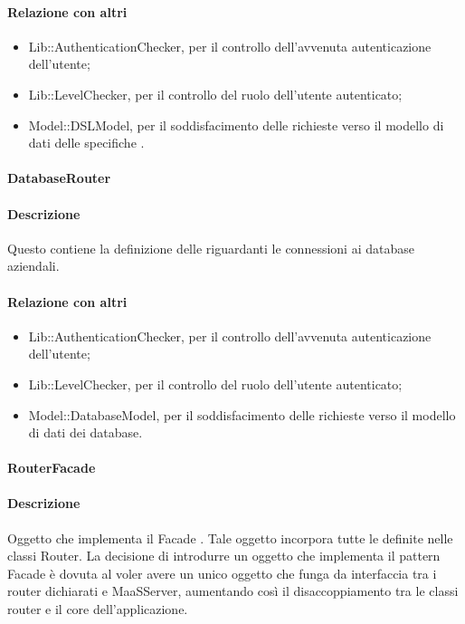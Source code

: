 \paragraph*{Relazione con altri }
\begin{itemize}
\item Lib::AuthenticationChecker, per il controllo dell'avvenuta autenticazione dell'utente;
\item Lib::LevelChecker, per il controllo del ruolo dell'utente autenticato;
\item Model::DSLModel, per il soddisfacimento delle richieste verso il modello di dati delle specifiche .
\end{itemize}

\paragraph{DatabaseRouter}
\paragraph*{Descrizione}
Questo  contiene la definizione delle  riguardanti le connessioni ai database aziendali.

\paragraph*{Relazione con altri }
\begin{itemize}
\item Lib::AuthenticationChecker, per il controllo dell'avvenuta autenticazione dell'utente;
\item Lib::LevelChecker, per il controllo del ruolo dell'utente autenticato;
\item Model::DatabaseModel, per il soddisfacimento delle richieste verso il modello di dati dei database.
\end{itemize}

\paragraph{RouterFacade}
\paragraph*{Descrizione}
Oggetto che implementa il Facade . Tale oggetto incorpora tutte le  definite nelle classi Router.
La decisione di introdurre un oggetto che implementa il pattern Facade è dovuta al voler avere un unico oggetto che funga da interfaccia tra i router dichiarati e MaaSServer, aumentando così il disaccoppiamento tra le classi router e il core dell'applicazione.  

